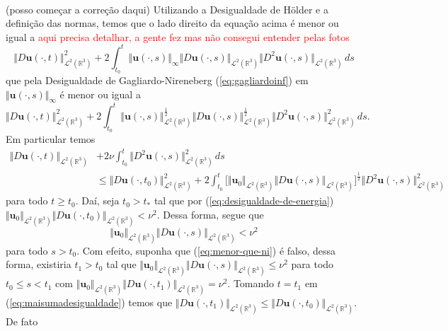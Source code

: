 \documentclass[a4paper, 11pt]{book}
\theoremstyle{definition}
\newcommand{\bR}{\mathbb{R}}
\newcommand{\bu}{\mathbf{u}}
\newcommand{\cL}{\mathcal{L}}
\begin{document}
\begin{prf}
\[\begin{aligned}
        \end{aligned}
    \]
    (posso começar a correção daqui)
    Utilizando a Desigualdade de Hölder e a definição das normas, temos que o lado direito da equação acima é menor ou igual a \textcolor{red}{aqui precisa detalhar, a gente fez mas não consegui entender pelas fotos}
    \[
        \Vert D\bu(\cdot,t) \Vert_{\cL^2(\bR^3)}^2 + 2 \! \int_{t_0}^t \Vert \bu(\cdot,s) \Vert_{\infty} \Vert D\bu(\cdot,s) \Vert_{\cL^2(\bR^3)} \Vert D^2\bu(\cdot,s) \Vert_{\cL^2(\bR^3)} \,ds
    \]
    que pela Desigualdade de Gagliardo-Nireneberg (\ref{eq:gagliardoinf}) em $\Vert \bu(\cdot,s) \Vert_{\infty}$ é menor ou igual a
    \[
        \Vert D\bu(\cdot,t) \Vert_{\cL^2(\bR^3)}^2 + 2 \! \int_{t_0}^t \Vert \bu(\cdot,s) \Vert_{\cL^2(\bR^3)}^{\frac{1}{2}} \Vert D\bu(\cdot,s) \Vert_{\cL^2(\bR^3)}^{\frac{1}{2}} \Vert D^2\bu(\cdot,s) \Vert_{\cL^2(\bR^3)}^2 \,ds.
    \]
    Em particular temos
    \begin{equation} \label{eq:maisumadesigualdade}
        \begin{aligned}
            \Vert D\bu(\cdot,t) \Vert_{\cL^2(\bR^3)} &+ 2 \nu \int_{t_0}^t \Vert D^2 \bu(\cdot,s) \Vert_{\cL^2(\bR^3)}^2 \,ds\\ &\leqslant \Vert D\bu(\cdot,t_0) \Vert_{\cL^2(\bR^3)}^2 + 2 \! \int_{t_0}^t \big[ \Vert \bu_0 \Vert_{\cL^2(\bR^3)} \Vert D\bu(\cdot,s) \Vert_{\cL^2(\bR^3)} \big]^\frac{1}{2} \Vert D^2\bu(\cdot,s) \Vert_{\cL^2(\bR^3)}^2
        \end{aligned}
    \end{equation}
    para todo $t \geqslant t_0$. Daí, seja $t_0 > t_*$ tal que por (\ref{eq:desigualdade-de-energia}) $\Vert \bu_0 \Vert_{\cL^2(\bR^3)} \Vert D\bu(\cdot,t_0 ) \Vert_{\cL^2(\bR^3)} < \nu^2$.
    Dessa forma, segue que
    \begin{equation} \label{eq:menor-que-ni}
        \Vert \bu_0 \Vert_{\cL^2(\bR^3)} \Vert D\bu(\cdot,s) \Vert_{\cL^2(\bR^3)} < \nu^2
    \end{equation}
    para todo $s > t_0$.
    Com efeito, suponha que (\ref{eq:menor-que-ni}) é falso, dessa forma, existiria $t_1 > t_0$ tal que $\Vert \bu_0  \Vert_{\cL^2(\bR^3)} \Vert D\bu(\cdot,s) \Vert_{\cL^2(\bR^3)} \leqslant \nu^2$ para todo $t_0 \leqslant s < t_1$ com $\Vert \bu_0  \Vert_{\cL^2(\bR^3)} \Vert D\bu(\cdot,t_1) \Vert_{\cL^2(\bR^3)} = \nu^2$. Tomando $t = t_1$ em (\ref{eq:maisumadesigualdade}) temos que $\Vert D\bu(\cdot,t_1) \Vert_{\cL^2(\bR^3)} \leqslant \Vert D\bu(\cdot,t_0) \Vert_{\cL^2(\bR^3)}$. De fato
    \[
        \begin{aligned}

\end{aligned}\]
\end{prf}
\end{document}
